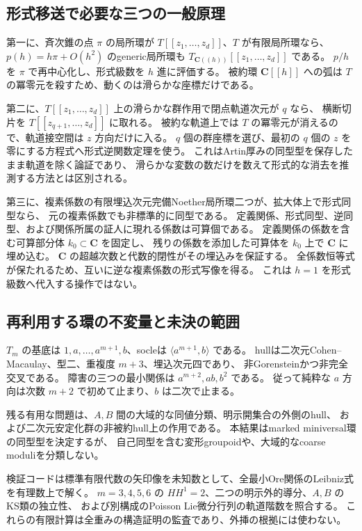 \subsection{形式移送で必要な三つの一般原理}

第一に、斉次錐の点 $\pi$ の局所環が $T[[z_1,\ldots,z_d]]$、$T$ が有限局所環なら、
$p(h)=h\pi+O(h^2)$ のgeneric局所環も $T_{\mathbf C((h))}[[z_1,\ldots,z_d]]$ である。
$p/h$ を $\pi$ で再中心化し、形式級数を $h$ 進に評価する。
被約環 $\mathbf C[[h]]$ への弧は $T$ の冪零元を殺すため、動くのは滑らかな座標だけである。

第二に、$T[[z_1,\ldots,z_d]]$ 上の滑らかな群作用で閉点軌道次元が $q$ なら、
横断切片を $T[[z_{q+1},\ldots,z_d]]$ に取れる。
被約な軌道上では $T$ の冪零元が消えるので、軌道接空間は $z$ 方向だけに入る。
$q$ 個の群座標を選び、最初の $q$ 個の $z$ を零にする方程式へ形式逆関数定理を使う。
これはArtin厚みの同型型を保存したまま軌道を除く論証であり、
滑らかな変数の数だけを数えて形式的な消去を推測する方法とは区別される。

第三に、複素係数の有限埋込次元完備Noether局所環二つが、拡大体上で形式同型なら、
元の複素係数でも非標準的に同型である。
定義関係、形式同型、逆同型、および関係所属の証人に現れる係数は可算個である。
定義関係の係数を含む可算部分体 $k_0\subset\mathbf C$ を固定し、
残りの係数を添加した可算体を $k_0$ 上で $\mathbf C$ に埋め込む。
$\mathbf C$ の超越次数と代数的閉性がその埋込みを保証する。
全係数恒等式が保たれるため、互いに逆な複素係数の形式写像を得る。
これは $h=1$ を形式級数へ代入する操作ではない。

\subsection{再利用する環の不変量と未決の範囲}

$T_m$ の基底は $1,a,\ldots,a^{m+1},b$、socleは
$\langle a^{m+1},b\rangle$ である。
hullは二次元Cohen--Macaulay、型二、重複度 $m+3$、埋込次元四であり、
非Gorensteinかつ非完全交叉である。
障害の三つの最小関係は $a^{m+2},ab,b^2$ である。
従って純粋な $a$ 方向は次数 $m+2$ で初めて止まり、$b$ は二次で止まる。

残る有用な問題は、$A,B$ 間の大域的な同値分類、明示開集合の外側のhull、
および二次元安定化群の非被約hull上の作用である。
本結果はmarked miniversal環の同型型を決定するが、
自己同型を含む変形groupoidや、大域的なcoarse moduliを分類しない。

検証コードは標準有限代数の矢印像を未知数として、全最小Ore関係のLeibniz式を有理数上で解く。
$m=3,4,5,6$ の $HH^1=2$、二つの明示外的導分、$A,B$ のKS類の独立性、
および別構成のPoisson Lie微分行列の軌道階数を照合する。
これらの有限計算は全重みの構造証明の監査であり、外挿の根拠には使わない。

